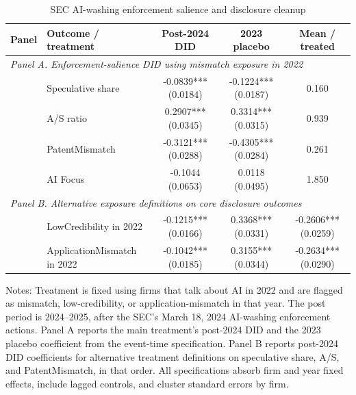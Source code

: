 \begin{table}[!htbp]
\centering
\caption{SEC AI-washing enforcement salience and disclosure cleanup}
\label{tab:sec_enforcement_did_v32}
\small
\begin{tabular}{llccc}
\hline
Panel & Outcome / treatment & Post-2024 DID & 2023 placebo & Mean / treated \\
\hline
\multicolumn{5}{l}{\textit{Panel A. Enforcement-salience DID using mismatch exposure in 2022}} \\
 & Speculative share & -0.0839*** (0.0184) & -0.1224*** (0.0187) & 0.160 \\
 & A/S ratio & 0.2907*** (0.0345) & 0.3314*** (0.0315) & 0.939 \\
 & PatentMismatch & -0.3121*** (0.0288) & -0.4305*** (0.0284) & 0.261 \\
 & AI Focus & -0.1044 (0.0653) & 0.0118 (0.0495) & 1.850 \\
\multicolumn{5}{l}{\textit{Panel B. Alternative exposure definitions on core disclosure outcomes}} \\
 & LowCredibility in 2022 & -0.1215*** (0.0166) & 0.3368*** (0.0331) & -0.2606*** (0.0259) \\
 & ApplicationMismatch in 2022 & -0.1042*** (0.0185) & 0.3155*** (0.0344) & -0.2634*** (0.0290) \\
\hline
\end{tabular}
\begin{flushleft}
\footnotesize Notes: Treatment is fixed using firms that talk about AI in 2022 and are flagged as mismatch, low-credibility, or application-mismatch in that year. The post period is 2024--2025, after the SEC's March 18, 2024 AI-washing enforcement actions. Panel A reports the main treatment's post-2024 DID and the 2023 placebo coefficient from the event-time specification. Panel B reports post-2024 DID coefficients for alternative treatment definitions on speculative share, A/S, and PatentMismatch, in that order. All specifications absorb firm and year fixed effects, include lagged controls, and cluster standard errors by firm.
\end{flushleft}
\end{table}
